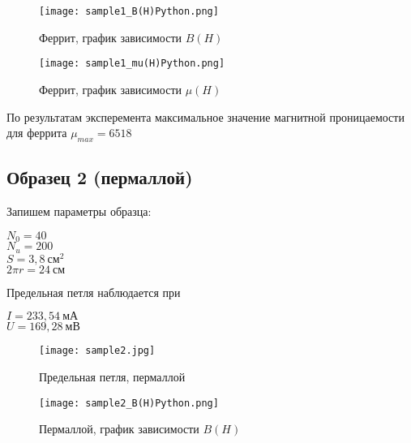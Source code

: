 \begin{figure}
	\centering
	\texttt{[image: sample1\_B(H)Python.png]}
	\caption{Феррит, график зависимости $B(H)$}
	\label{sample1_BH}
\end{figure}

\begin{figure}
	\centering
	\texttt{[image: sample1\_mu(H)Python.png]}
	\caption{Феррит, график зависимости $\mu(H)$}
	\label{sample1_muH}
\end{figure}

\newpage



По результатам эксперемента максимальное значение магнитной проницаемости
для феррита $\mu_{max} = 6518$

\begin{center}
\end{center}

\subsection{Образец 2 (пермаллой)}

Запишем параметры образца:

\begin{center}
	$N_0 = 40$                   \\
	$N_u = 200$                  \\
	$S = 3,8 ~ \text{см}^2$      \\
	$2 \pi r = 24 ~ \text{см}$
\end{center}

Предельная петля наблюдается при 

\begin{center}
	$I = 233,54 ~ \text{мА}$ \\
	$U = 169,28 ~ \text{мВ}$
\end{center}

\newpage

\begin{figure}[h!]
	\centering
	\texttt{[image: sample2.jpg]}
	\caption{Предельная петля, пермаллой}
	\label{sample2_pic}
\end{figure}

\begin{figure}
	\centering
	\texttt{[image: sample2\_B(H)Python.png]}
	\caption{Пермаллой, график зависимости $B(H)$}
	\label{sample2_BH}
\end{figure}

